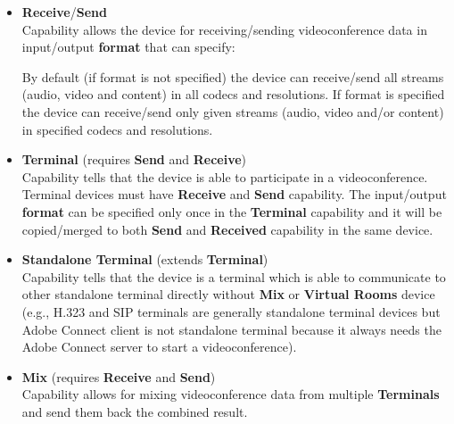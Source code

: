 \begin{itemize}
\newcommand{\RequireCapability}[1]{(requires #1)}
\newcommand{\ExtendCapability}[1]{(extends #1)}
  
\item \textbf{Receive}/\textbf{Send} \\
  Capability allows the device for receiving/sending videoconference data in
  input/output \textbf{format} that can specify:
  By default (if format is not specified) the device can receive/send all 
  streams (audio, video and content) in all codecs and resolutions.
  If format is specified the device can receive/send only
  given streams (audio, video and/or content) in specified 
  codecs and resolutions.
  
\item \textbf{Terminal} %
  \RequireCapability{\textbf{Send} and \textbf{Receive}} \\
  Capability tells that the device is able to participate in a 
  videoconference. Terminal devices must have \textbf{Receive} and 
  \textbf{Send} capability. The input/output \textbf{format} can be 
  specified only once in the \textbf{Terminal} capability and it will be 
  copied/merged to both \textbf{Send} and \textbf{Received} capability in the 
  same device.
  
\item \textbf{Standalone Terminal} \ExtendCapability{\textbf{Terminal}} \\
  Capability tells that the device is a terminal which is able to communicate 
  to other standalone terminal directly without \textbf{Mix} or 
  \textbf{Virtual Rooms} device (e.g., H.323 and SIP terminals are generally 
  standalone terminal devices but Adobe Connect client is not standalone 
  terminal because it always needs the Adobe Connect server to start a 
  videoconference).
  
\item \textbf{Mix} \RequireCapability{\textbf{Receive} and \textbf{Send}} \\
  Capability allows for mixing videoconference data from multiple 
  \textbf{Terminals} and send them back the combined result.
  

\end{itemize}
